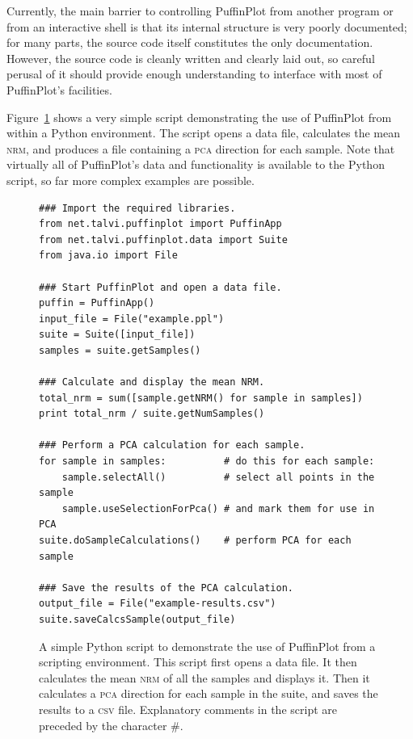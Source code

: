 \documentclass[a4paper]{article}
\newcommand{\caps}[1]{\textsc{#1}} %
\begin{document}
Currently, the main barrier to controlling PuffinPlot from another program or
from an interactive shell is that its internal structure is very poorly
documented; for many parts, the source code itself constitutes the only
documentation. However, the source code is cleanly written and clearly laid
out, so careful perusal of it should provide enough understanding to
interface with most of PuffinPlot's facilities.

Figure~\ref{fig:manual-script-example} shows a very simple script
demonstrating the use of PuffinPlot from within a Python environment. The
script opens a data file, calculates the mean \caps{nrm}, and produces a file
containing a \caps{pca} direction for each sample. Note that virtually all of
PuffinPlot's data and functionality is available to the Python script, so far
more complex examples are possible.

\begin{figure}
  \caption{\label{fig:manual-script-example}A simple Python script to
    demonstrate the use of PuffinPlot from a scripting environment. This
    script first opens a data file. It then calculates the mean \caps{nrm} of
    all the samples and displays it. Then it calculates a \caps{pca}
    direction for each sample in the suite, and saves the results to a
    \caps{csv} file. Explanatory comments in the script are preceded by the
    character \#.}
\begin{verbatim}
### Import the required libraries.
from net.talvi.puffinplot import PuffinApp
from net.talvi.puffinplot.data import Suite
from java.io import File

### Start PuffinPlot and open a data file.
puffin = PuffinApp()
input_file = File("example.ppl")
suite = Suite([input_file])
samples = suite.getSamples()

### Calculate and display the mean NRM.
total_nrm = sum([sample.getNRM() for sample in samples])
print total_nrm / suite.getNumSamples()

### Perform a PCA calculation for each sample.
for sample in samples:          # do this for each sample:
    sample.selectAll()          # select all points in the sample
    sample.useSelectionForPca() # and mark them for use in PCA
suite.doSampleCalculations()    # perform PCA for each sample

### Save the results of the PCA calculation.
output_file = File("example-results.csv")
suite.saveCalcsSample(output_file)
\end{verbatim}
\end{figure}

\newpage


\end{document}
